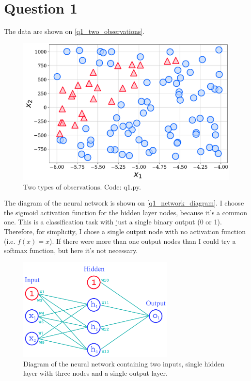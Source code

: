 \section{Question 1}

The data are shown on \autoref{q1_two_observations}.

\begin{figure}[!ht]
  \centering
  \includegraphics[width=1\textwidth]{figures/q1.pdf}
  \caption{Two types of observations. Code: q1.py.}
  \label{q1_two_observations}
\end{figure}

The diagram of the neural network is shown on \autoref{q1_network_diagram}. I choose the sigmoid activation function for the hidden layer nodes, because it's a common one. This is a classification task with just a single binary output (0 or 1). Therefore, for simplicity, I chose a single output node with no activation function (i.e. $f(x) = x$). If there were more than one output nodes than I could try a softmax function, but here it's not necessary.

\begin{figure}[!ht]
  \centering
  \includegraphics[width=0.7\textwidth]{figures/q1_neural_network.pdf}
  \caption{Diagram of the neural network containing two inputs, single hidden layer with three nodes and a single output layer.}
  \label{q1_network_diagram}
\end{figure}


